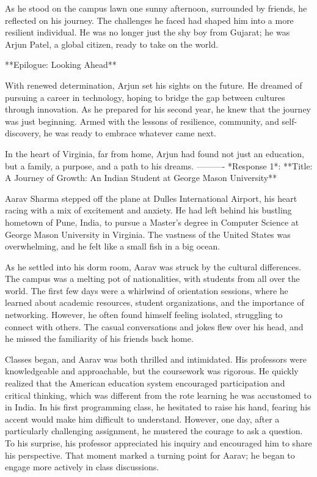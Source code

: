 \documentclass[11pt,addpoints,answers]{exam}
\begin{document}
\begin{questions}
\begin{tcolorbox}[fit,height=22cm, width=16cm, blank, borderline={1pt}{-2pt},nobeforeafter]
As he stood on the campus lawn one sunny afternoon, surrounded by friends, he reflected on his journey. The challenges he faced had shaped him into a more resilient individual. He was no longer just the shy boy from Gujarat; he was Arjun Patel, a global citizen, ready to take on the world.

**Epilogue: Looking Ahead**

With renewed determination, Arjun set his sights on the future. He dreamed of pursuing a career in technology, hoping to bridge the gap between cultures through innovation. As he prepared for his second year, he knew that the journey was just beginning. Armed with the lessons of resilience, community, and self-discovery, he was ready to embrace whatever came next.

In the heart of Virginia, far from home, Arjun had found not just an education, but a family, a purpose, and a path to his dreams.
----------
*Response 1*:  **Title: A Journey of Growth: An Indian Student at George Mason University**

Aarav Sharma stepped off the plane at Dulles International Airport, his heart racing with a mix of excitement and anxiety. He had left behind his bustling hometown of Pune, India, to pursue a Master’s degree in Computer Science at George Mason University in Virginia. The vastness of the United States was overwhelming, and he felt like a small fish in a big ocean.

As he settled into his dorm room, Aarav was struck by the cultural differences. The campus was a melting pot of nationalities, with students from all over the world. The first few days were a whirlwind of orientation sessions, where he learned about academic resources, student organizations, and the importance of networking. However, he often found himself feeling isolated, struggling to connect with others. The casual conversations and jokes flew over his head, and he missed the familiarity of his friends back home.

Classes began, and Aarav was both thrilled and intimidated. His professors were knowledgeable and approachable, but the coursework was rigorous. He quickly realized that the American education system encouraged participation and critical thinking, which was different from the rote learning he was accustomed to in India. In his first programming class, he hesitated to raise his hand, fearing his accent would make him difficult to understand. However, one day, after a particularly challenging assignment, he mustered the courage to ask a question. To his surprise, his professor appreciated his inquiry and encouraged him to share his perspective. That moment marked a turning point for Aarav; he began to engage more actively in class discussions.


\end{tcolorbox}
\end{questions}
\end{document}
